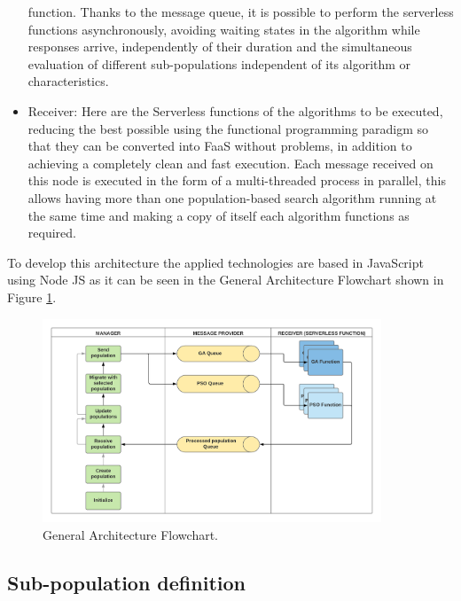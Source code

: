 \documentclass[runningheads]{llncs}
\begin{document}
\begin{itemize}
function. Thanks to the message queue, it is possible to perform the serverless
functions asynchronously, avoiding waiting states in the algorithm
while responses arrive, 
independently of their duration and the simultaneous evaluation of different
sub-populations independent of its algorithm or characteristics.
\item Receiver: Here are the Serverless
  functions of the %
algorithms to be executed, reducing the best possible using the functional
programming paradigm so that they can be converted into FaaS without problems,
in addition to achieving a completely clean and fast
execution\cite{Roberts2016}. Each message received on this node is executed in
the form of a multi-threaded process in parallel, this allows having more than
one population-based search algorithm running at the same time and making a copy
of itself each algorithm functions as required.
\end{itemize}

To develop this architecture the applied technologies are based in JavaScript
using Node JS as it can be seen in the General Architecture Flowchart
shown in Figure \ref{fig2}.

\begin{figure}[htp]
  \centering
  \includegraphics[width=0.9\textwidth]{img/Architecture diagram.png}
  \caption{General Architecture Flowchart.} \label{fig2}
  \end{figure}
  
\subsection{Sub-population definition}
\end{document}
